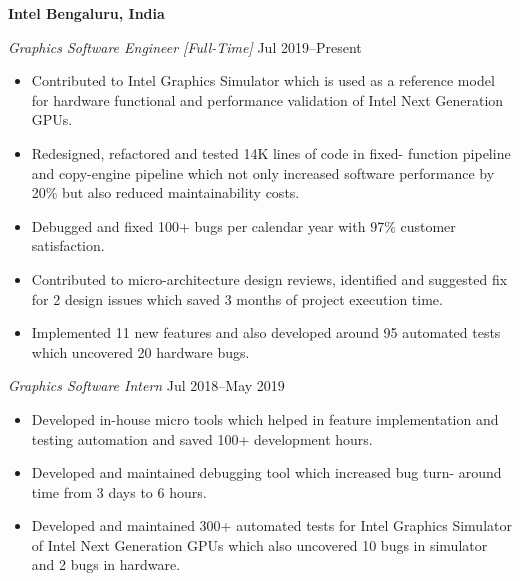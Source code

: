 \textbf{Intel \hfill  Bengaluru, India} \par
\textit{Graphics Software Engineer \small [Full-Time]} \hfill Jul 2019--Present
\begin{itemize}
	\item Contributed to Intel Graphics Simulator which is used as a reference model for hardware functional and performance validation of Intel Next Generation GPUs.
	\item Redesigned, refactored and tested 14K lines of code in fixed- function pipeline and copy-engine pipeline which not only increased software performance by 20\% but also reduced maintainability costs.
	\item Debugged and fixed 100+ bugs per calendar year with 97\% customer satisfaction.
	\item Contributed to micro-architecture design reviews, identified and suggested fix for 2 design issues which saved 3 months of project execution time.
	\item Implemented 11 new features and also developed around 95 automated tests which uncovered 20 hardware bugs.
\end{itemize} \par
\textit{Graphics Software Intern} \hfill Jul 2018--May 2019
\begin{itemize}
	\item Developed in-house micro tools which helped in feature implementation and testing automation and saved 100+ development hours.
	\item Developed and maintained debugging tool which increased bug turn- around time from 3 days to 6 hours.
	\item Developed and maintained 300+ automated tests for Intel Graphics Simulator of Intel Next Generation GPUs which also uncovered 10 bugs in simulator and 2 bugs in hardware.
\end{itemize} \par